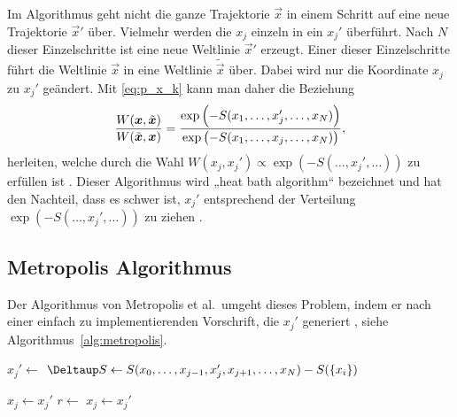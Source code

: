 Im Algorithmus geht nicht die ganze Trajektorie $\vec x$ in einem Schritt auf
eine neue Trajektorie $\vec x'$ über. Vielmehr werden die $x_j$ einzeln in ein
$x_j'$ überführt. Nach $N$ dieser Einzelschritte ist eine neue Weltlinie $\vec
x'$ erzeugt. Einer dieser Einzelschritte führt die Weltlinie $\vec x$ in eine
Weltlinie $\tilde{\vec x}$ über. Dabei wird nur die Koordinate $x_j$ zu $x_j'$
geändert. Mit \eqref{eq:p_x_k} kann man daher die Beziehung
\parencite[(3.25)]{Creutz/Statistical_Approach_QM}
\[
    \frac{W(\vec x, \tilde{\vec x})}{W(\tilde{\vec x}, \vec x)}
    = \frac{\exp\del{-S(x_1, \ldots, x_j', \ldots, x_N)}}{\exp\del{-S(x_1, \ldots, x_j,
    \ldots, x_N)}},
\]
herleiten, welche durch die Wahl $W(x_j, x_j') \propto \exp(-S(\ldots, x_j',
\ldots))$ zu erfüllen ist \parencite[(3.27)]{Creutz/Statistical_Approach_QM}.
Dieser Algorithmus wird „heat bath algorithm“ bezeichnet und hat den Nachteil,
dass es schwer ist, $x_j'$ entsprechend der Verteilung $\exp(-S(\ldots, x_j',
\ldots))$ zu ziehen \parencite[438]{Creutz/Statistical_Approach_QM}.

\subsection{Metropolis Algorithmus}

Der Algorithmus von Metropolis et al.\ umgeht dieses Problem, indem er nach
einer einfach zu implementierenden Vorschrift, die $x_j'$ generiert
\parencite[439]{Creutz/Statistical_Approach_QM}, siehe
Algorithmus~\ref{alg:metropolis}.

\begin{algorithm}
    \begin{algorithmic}
            \State $x_j' \gets$ 
            \State $\Deltaup S \gets S(x_0, \ldots, x_{j-1}, x_j',
            x_{j+1}, \ldots, x_\timesites) - S(\{x_i\})$

                \State $x_j \gets x_j'$
            \Else
                \State $r \gets$ 
                    \State $x_j \gets x_j'$
                \EndIf
            \EndIf
        \EndFor
    \end{algorithmic}
    \caption{%
        Metropolisalgorithmus. Die Funktion $\textsc{Zufallzahl}(a, b)$ erzeugt
        eine Zufallszahl im Interval $(a, b)$.
    }
    \label{alg:metropolis}
\end{algorithm}

